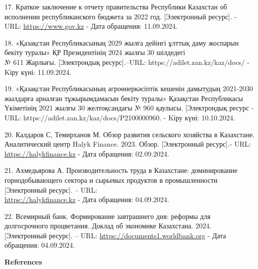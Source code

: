 \begin{references}
17. Краткое заключение к отчету правительства Республики Казахстан об
исполнении республиканского бюджета за 2022 год. {[}Электронный
ресурс{]}. - URL:
\href{https://www.gov.kz/uploads/2023/5/18/f1f30399b1cf29f090a2a7a39}{https://www.gov.kz} -
Дата обращения: 11.09.2024.

18. «Қазақстан Республикасының 2029 жылға дейінгі ұлттық даму жоспарын
бекіту туралы» ҚР Президентінің 2024 жылғы 30 шілдедегі\\
№ 611 Жарлығы. {[}Электрондық ресурс{]}.--URL:
https://adilet.zan.kz/kaz/docs/ - Kіру күні: 11.09.2024.

19. «Қазақстан Республикасының агроөнеркәсіптік кешенін дамытудың
2021-2030 жылдарға арналған тұжырымдамасын бекіту туралы» Қазақстан
Республикасы Үкіметінің 2021 жылғы 30 желтоқсандағы № 960 қаулысы.
{[}Электрондық ресурс - URL: https://adilet.zan.kz/kaz/docs/P2100000960.
- Kіру күні: 10.10.2024.

20. Калдаров С, Темирханов М. Обзор развития сельского хозяйства в
Казахстане. Аналитический центр Halyk Finance. 2023. Обзор.
{[}Электронный ресурс{]}.- URL:
\href{https://halykfinance.kz/download/files/analytics/AC_agriculture_development.pdf}{https://halykfinance.kz}
- Дата обращения: 02.09.2024.

21. Ахмедьярова А. Производительность труда в Казахстане: доминирование
горнодобывающего сектора и сырьевых продуктов в промышленности
{[}Электронный ресурс{]}. -- URL:\\
\href{https://halykfinance.kz/download/files/analytics/ac_labor2.pdf}{https://halykfinance.kz} - Дата
обращения: 04.09.2024.

22. Всемирный банк. Формирование завтрашнего дня: реформы для
долгосрочного процветания. Доклад об экономике Казахстана. 2024.
{[}Электронный ресурс{]}. -- URL:
\href{https://documents1.worldbank.org/curated/en.pdf}{https://documents1.worldbank.org} - Дата обращения:
04.09.2024.
\end{references}

\begin{center}
{\bfseries References}
\end{center}

